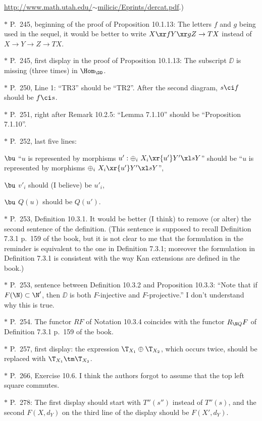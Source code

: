 \documentclass[12pt]{article}
\theoremstyle{remark}
\theoremstyle{definition}
\begin{document}
\href{http://www.math.utah.edu/~milicic/Eprints/dercat.pdf}{http://www.math.utah.edu/$\sim$milicic/Eprints/dercat.pdf}.)

\nn$*$ P.~245, beginning of the proof of Proposition 10.1.13: The letters $f$ and $g$ being used in the sequel, it would be better to write $X\xr fY\xr gZ\to TX$ instead of $X\to Y\to Z\to TX$. 

\nn$*$ P.~245, first display in the proof of Proposition 10.1.13: The subscript $\DD$ is missing (three times) in $\Hom_\DD$.

\nn$*$ P.~250, Line 1: ``TR3'' should be ``TR2''. After the second diagram, $s\ci f$ should be $f\ci s$.

\nn$*$ P.~251, right after Remark 10.2.5: ``Lemma 7.1.10'' should be ``Proposition 7.1.10''.

\nn$*$ P.~252, last five lines:

$\bu$ ``$u$ is represented by morphisms $u':\oplus_i\ X_i\xr{u'}Y'\xl sY$'' should be ``$u$ is represented by morphisms $\oplus_i\ X_i\xr{u'}Y'\xl sY$'',

$\bu$ $v'_i$ should (I believe) be $u'_i$,

$\bu$ $Q(u)$ should be $Q(u')$.

\nn$*$ P.~253, Definition 10.3.1. It would be better (I think) to remove (or alter) the second sentence of the definition. (This sentence is supposed to recall Definition 7.3.1 p.~159 of the book, but it is not clear to me that the formulation in the reminder is equivalent to the one in Definition 7.3.1; moreover the formulation in Definition 7.3.1 is consistent with the way Kan extensions are defined in the book.)

\nn$*$ P.~253, sentence between Definition 10.3.2 and Proposition 10.3.3: ``Note that if $F(\N)\subset\N'$, then $\DD$ is both $F$-injective and $F$-projective.'' I don't understand why this is true.

\nn$*$ P.~254. The functor $RF$ of Notation 10.3.4 coincides with the functor $R_{\N Q}F$ of Definition 7.3.1 p.~159 of the book.

\nn$*$ P.~257, first display: the expression $\T_{X_1}\oplus\T_{X_2}$, which occurs twice, should be replaced with $\T_{X_1}\tm\T_{X_2}$.

\nn$*$ P.~266, Exercise 10.6. I think the authors forgot to assume that the top left square commutes.

\nn$*$ P.~278: The first display should start with $T''(s'')$ instead of $T''(s)$, and the second $F(X,d_Y)$ on the third line of the display should be $F(X',d_Y)$.
\end{document}
